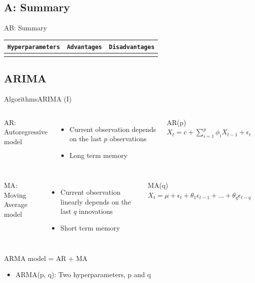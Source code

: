 \documentclass[10pt,compress]{beamer} %
\begin{document}
\subsection{A: Summary}
\begin{frame}{A}{B: Summary}
	\begin{center}
	\begin{tabular}{cp{3cm}p{3cm}}\hline
	 	\texttt{Hyperparameters}  & \texttt{Advantages}  & \texttt{Disadvantages} \\\hline
	 	                          &                               &   \\
	 	\hline
	\end{tabular}
	\end{center}
\end{frame}






\subsection{ARIMA}
\begin{frame}{Algorithms}{ARIMA (I)}
    \begin{columns}
	   AR: Autoregressive model
	    \begin{itemize}
		\item Current observation depends on the last $p$ observations
		\item Long term memory
	    \end{itemize}

		\begin{block}{AR(p)}
			$X_t = c+\sum_{i=1}^p \phi_i X_{t-1}+\epsilon_t$
        	\end{block}
    \end{columns}

    \smallskip

    \begin{columns}
	   MA: Moving Average model
	    \begin{itemize}
		\item Current observation linearly depends on the last $q$ innovations
		\item Short term memory
	    \end{itemize}

		\begin{block}{MA(q)}
			$X_t =  \mu + \epsilon_t + \theta_1 \epsilon_{t-1} + ... + \theta_q \epsilon_{t-q}$
        	\end{block}
    \end{columns}

    \bigskip

    ARMA model = AR + MA
	\begin{itemize}
		\item ARMA(p, q): Two hyperparameters, p and q
	\end{itemize}

\end{frame}
\end{document}
